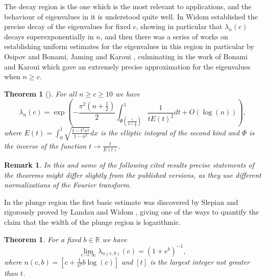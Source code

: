 \documentclass[12pt]{amsart}
\numberwithin{equation}{section}
\newcommand{\R}{\mathbb{R}}
\newtheorem{theorem}[Thm]{Theorem}
\newtheorem{remark}[Thm]{Remark}
\begin{document}
The decay region is the one which is the most relevant to applications, and the behaviour of eigenvalues in it is understood quite well. In \cite{Wid} Widom established the precise decay of the eigenvalues for fixed $c$, showing in particular that $\lambda_n(c)$ decays superexponentially in $n$, and then there was a series of works on establishing uniform estimates for the eigenvalues in this region in particular by Osipov \cite{Osi} and Bonami, Jaming and Karoui \cite{Jam}, culminating in the work of Bonami and Karoui \cite{Bon} which gave an extremely precise approximation for the eigenvalues when $n \ge c$.
\begin{theorem}[{\cite[Theorem 1]{Bon}}]\label{Bonami}
For all $n \ge c \ge 10$ we have
$$\lambda_n(c) = \exp\left(-\frac{\pi^2\left(n+\frac{1}{2}\right)}{2} \int_{\Phi\left(\frac{c}{n+\frac{1}{2}}\right)}^1 \frac{1}{tE(t)^2}dt+O(\log(n))\right),$$
where $E(t) = \int_0^1 \sqrt{\frac{1-t^2x^2}{1-x^2}}dx$ is the elliptic integral of the second kind and $\Phi$ is the inverse of the function $t\to \frac{t}{E(t)}$. 	
\end{theorem}
\begin{remark}
In this and some of the following cited results precise statements of the theorems might differ slightly from the published versions, as they use different normalizations of the Fourier transform.
\end{remark}
In the plunge region the first basic estimate was discovered by Slepian \cite{Sle} and rigorously proved by Landau and Widom \cite{Lan}, giving one of the ways to quantify the claim that the width of the plunge region is logarithmic.
\begin{theorem}\label{Slepian}
For a fixed $b\in \R$ we have
$$\lim_{c\to \infty} \lambda_{n(c, b)}(c) = (1+e^b)^{-1},$$
where $n(c,b) = [c + \frac{1}{\pi^2}b\log(c)]$ and $[t]$ is the largest integer not greater than $t$.
\end{theorem}
\end{document}
